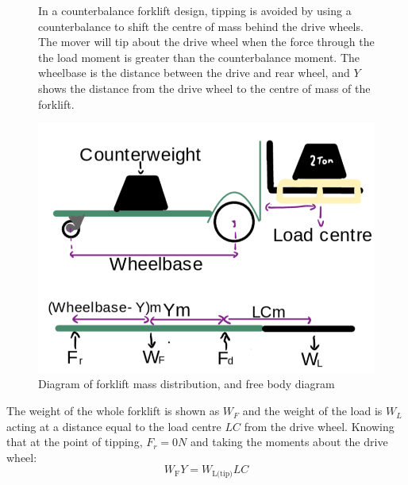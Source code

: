 \documentclass[12pt,titlepage]{article}
\begin{document}
\begin{figure}[H]
    \centering
    \begin{minipage}[t]{0.57\textwidth}
        \vspace{0pt} %
        In a counterbalance forklift design, tipping is avoided by using a counterbalance to shift the centre of mass behind the drive wheels. The mover will tip about the drive wheel when the force through the the load moment is greater than the counterbalance moment. The wheelbase is the distance between the drive and rear wheel, and \( Y \) shows the distance from the drive wheel to the centre of mass of the forklift. 
    \end{minipage}%
    \hfill
    \begin{minipage}[t]{0.38\textwidth}
        \vspace{-10pt}
        \centering
        \includegraphics[width=\linewidth]{Tipping Calculations 3.png}
        \vspace{-30pt}
        \caption{Diagram of forklift mass distribution, and free body diagram}
        \label{fig:x}
    \end{minipage}
\end{figure}
The weight of the whole forklift is shown as \(W_F\) and the weight of the load is \(W_L\) acting at a distance equal to the load centre \(LC\) from the drive wheel. Knowing that at the point of tipping, $F_r = 0N$ and taking the moments about the drive wheel:
\vspace{-17pt}
\begin{equation}
    W_{\text{F}}Y = W_{\text{L(tip)}}LC
\end{equation}
\vspace{-46pt}
\end{document}
